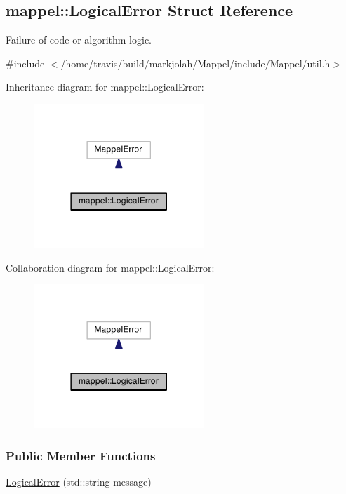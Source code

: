 \hypertarget{structmappel_1_1LogicalError}{}\subsection{mappel\+:\+:Logical\+Error Struct Reference}
\label{structmappel_1_1LogicalError}


Failure of code or algorithm logic.  




{\ttfamily \#include $<$/home/travis/build/markjolah/\+Mappel/include/\+Mappel/util.\+h$>$}



Inheritance diagram for mappel\+:\+:Logical\+Error\+:\nopagebreak
\begin{figure}[H]
\begin{center}
\leavevmode
\includegraphics[width=182pt]{structmappel_1_1LogicalError__inherit__graph}
\end{center}
\end{figure}


Collaboration diagram for mappel\+:\+:Logical\+Error\+:\nopagebreak
\begin{figure}[H]
\begin{center}
\leavevmode
\includegraphics[width=182pt]{structmappel_1_1LogicalError__coll__graph}
\end{center}
\end{figure}
\subsubsection*{Public Member Functions}
\begin{DoxyCompactItemize}
\item 
\hyperlink{structmappel_1_1LogicalError_ae92e8080faa47fa6c95a890d32b72a4c}{Logical\+Error} (std\+::string message)
\end{DoxyCompactItemize}


